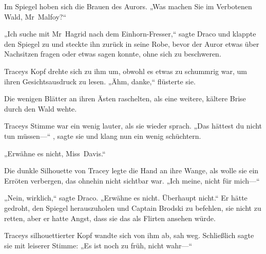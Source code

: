 Im Spiegel hoben sich die Brauen des Aurors. „Was machen Sie im Verbotenen Wald, Mr~Malfoy?“

„Ich suche mit Mr~Hagrid nach dem Einhorn-Fresser,“ sagte Draco und klappte den Spiegel zu und steckte ihn zurück in seine Robe, bevor der Auror etwas über Nachsitzen fragen oder etwas sagen konnte, ohne sich zu beschweren.

Traceys Kopf drehte sich zu ihm um, obwohl es etwas zu schummrig war, um ihren Gesichtsausdruck zu lesen. „Ähm, danke,“ flüsterte sie.

Die wenigen Blätter an ihren Ästen raschelten, als eine weitere, kältere Brise durch den Wald wehte.

Traceys Stimme war ein wenig lauter, als sie wieder sprach. „Das hättest du nicht tun müssen—“ , sagte sie und klang nun ein wenig schüchtern.

„Erwähne es nicht, Miss~Davis.“

Die dunkle Silhouette von Tracey legte die Hand an ihre Wange, als wolle sie ein Erröten verbergen, das ohnehin nicht sichtbar war. „Ich meine, nicht für mich—“

„Nein, wirklich,“ sagte Draco. „Erwähne es nicht. Überhaupt nicht.“
Er hätte gedroht, den Spiegel herauszuholen und Captain Brodski zu befehlen, sie nicht zu retten, aber er hatte Angst, dass sie das als Flirten ansehen würde.

Traceys silhouettierter Kopf wandte sich von ihm ab, sah weg. Schließlich sagte sie mit leiserer Stimme: „Es ist noch zu früh, nicht wahr—“

